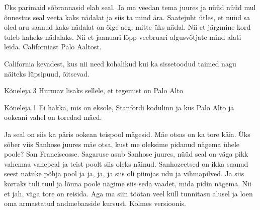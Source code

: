 Üks parimaid sõbrannasid elab seal. Ja ma veedan tema juures ja nüüd nüüd mul õnnestus seal veeta kaks nädalat ja siis ta mind ära. Saatejuht ütles, et nüüd sa oled aru saanud kaks nädalat on õige aeg, mitte üks nädal. Nii et järgmine kord tuleb kaheks nädalaks. Nii et jaanuari lõpp-veebruari algusvõtjate mind alati leida. Californiast Palo Aaltost. 

California kevadest, kus nii need kohalikud kui ka sissetoodud taimed nagu näiteks lüpsipuud, õitsevad. 

Kõneleja 3
Hurmav lisaks sellele, et tegemist on Palo Alto 

Kõneleja 1
Ei hakka, mis on eksole, Stanfordi kodulinn ja kus Palo Alto ja ookeani vahel on toredad mäed. 

Ja seal on siis ka päris ookean teispool mägesid. Mäe otsas on ka tore käia. Üks sõber viis Sanhose juures mäe otsa, kust me oleksime pidanud nägema ühele poole? San Franciscosse. Sagaruse asub Sanhose juures, nüüd seal on väga pikk vahemaa vahepeal ja teist poolt siis oleks näinud. Sanhozeetsed on ikka saanud seest natuke põhja pool ja ja, ja, ja siis oli piimjas udu ja vihmapilved. Ja siis korraks tuli tuul ja lõuna poole nägime siis seda vaadet, mida pidin nägema. Nii et jah, väga tore on reisida. Aga ma siin töötan veel küll tunnitasu alusel ja loen oma armastatud andmebaaside kursust. Kolmes versioonis. 
